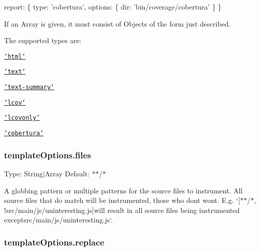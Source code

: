 \begin{DoxyCode}
report: \{
    type: \textcolor{stringliteral}{'cobertura'},
    options: \{
        dir: \textcolor{stringliteral}{'bin/coverage/cobertura'}
    \}
\}
\end{DoxyCode}


If an {\ttfamily Array} is given, it must consist of {\ttfamily Object}s of the form just described.

The supported types are\+:


\begin{DoxyItemize}
\item \href{http://gotwarlost.github.com/istanbul/public/apidocs/classes/HtmlReport.html}{\tt `html`}
\item \href{http://gotwarlost.github.com/istanbul/public/apidocs/classes/TextReport.html}{\tt `text`}
\item \href{http://gotwarlost.github.com/istanbul/public/apidocs/classes/TextSummaryReport.html}{\tt `text-\/summary`}
\item \href{http://gotwarlost.github.com/istanbul/public/apidocs/classes/LcovReport.html}{\tt `lcov`}
\item \href{http://gotwarlost.github.com/istanbul/public/apidocs/classes/LcovOnlyReport.html}{\tt `lcovonly`}
\item \href{http://gotwarlost.github.com/istanbul/public/apidocs/classes/CoberturaReport.html}{\tt `cobertura`}
\end{DoxyItemize}

\subsubsection*{template\+Options.\+files}

Type\+: {\ttfamily String$\vert$\+Array} Default\+: {\ttfamily $\ast$$\ast$/$\ast$}

A globbing pattern or multiple patterns for the source files to instrument. All source files that do match will be instrumented, those who don\textquotesingle{}t won\textquotesingle{}t. E.\+g. `\mbox{[}\textquotesingle{}$\ast$$\ast$/$\ast$\textquotesingle{}, \textquotesingle{}!src/main/js/uninteresting.js\textquotesingle{}\mbox{]}{\ttfamily will result in all source files being instrumented except}src/main/js/uninteresting.\+js`.

\subsubsection*{template\+Options.\+replace}

